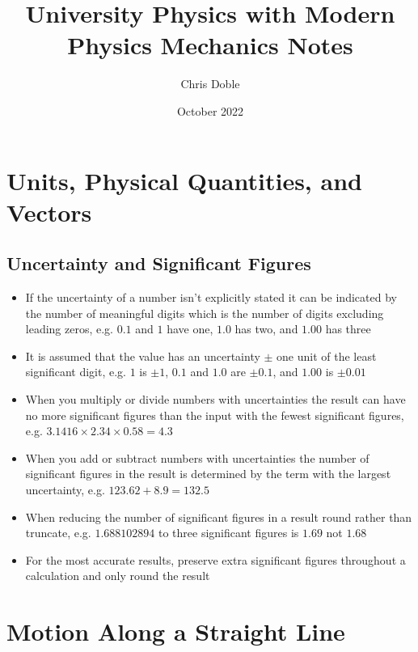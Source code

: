 \documentclass{article}
\title{University Physics with Modern Physics Mechanics Notes}
\author{Chris Doble}
\date{October 2022}
\begin{document}
\maketitle

\tableofcontents

\section{Units, Physical Quantities, and Vectors}

\setcounter{subsection}{4}
\subsection{Uncertainty and Significant Figures}

\begin{itemize}
  \item If the uncertainty of a number isn't explicitly stated it can be indicated by the number of meaningful digits which is the number of digits excluding leading zeros, e.g. $0.1$ and $1$ have one, $1.0$ has two, and $1.00$ has three

  \item It is assumed that the value has an uncertainty $\pm$ one unit of the least significant digit, e.g. $1$ is $\pm1$, $0.1$ and $1.0$ are $\pm0.1$, and $1.00$ is $\pm0.01$

  \item When you multiply or divide numbers with uncertainties the result can have no more significant figures than the input with the fewest significant figures, e.g. $3.1416 \times 2.34 \times 0.58 = 4.3$

  \item When you add or subtract numbers with uncertainties the number of significant figures in the result is determined by the term with the largest uncertainty, e.g. $123.62 + 8.9 = 132.5$

  \item When reducing the number of significant figures in a result round rather than truncate, e.g. $1.688102894$ to three significant figures is $1.69$ not $1.68$

  \item For the most accurate results, preserve extra significant figures throughout a calculation and only round the result
\end{itemize}

\section{Motion Along a Straight Line}
\end{document}
